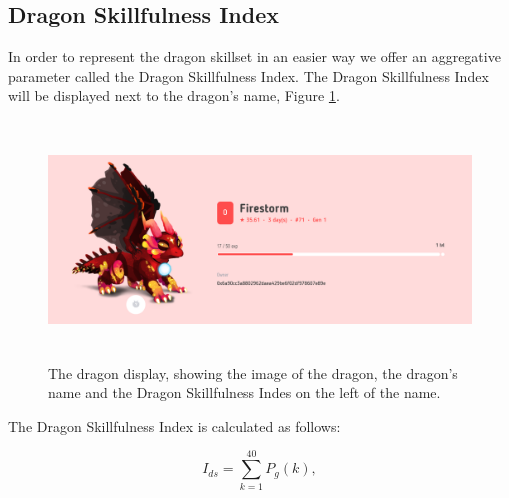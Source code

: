 \documentclass[12pt]{article}
\begin{document}
{\subsection{Dragon Skillfulness Index}
\label{Dragon Skillfulness Index}  \par

In order to represent the dragon skillset in an easier way we offer an aggregative parameter called the Dragon Skillfulness Index. The Dragon Skillfulness Index will be displayed next to the dragon’s name, Figure \ref{fig:The_dragon_display_showing_the_image_of_the_dragon_the_dragons_name_and_the_Dragon_Skillfulness_Indes_on_the_left_of_the_name}.\par




\begin{figure}[!ht]
	\begin{FlushLeft}		\includegraphics[width=6.27in,height=2.49in]{./media/image21.png}
		\caption{The dragon display, showing the image of the dragon, the dragon's name and the Dragon Skillfulness Indes on the left of the name.}
		\label{fig:The_dragon_display_showing_the_image_of_the_dragon_the_dragons_name_and_the_Dragon_Skillfulness_Indes_on_the_left_of_the_name}
	\end{FlushLeft}\end{figure}




\par

The Dragon Skillfulness Index is calculated as follows:\par

\setlength{\parskip}{0.0pt}
\begin{center}
  \begin{equation}
      I_{ds}=\sum_{k=1}^{40} P_g(k),
  \end{equation}
\end{center} \par

}
\end{document}
